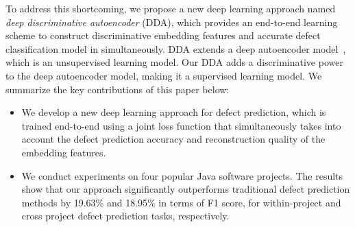 To address this shortcoming, we propose a new deep learning approach named \emph{deep discriminative autoencoder} (DDA), which provides an end-to-end learning scheme to construct discriminative embedding features and accurate defect classification model in simultaneously. DDA extends a deep autoencoder model~\cite{Vincent2010}, which is an unsupervised learning model. Our DDA adds a discriminative power to the deep autoencoder model, making it a supervised learning model.
We summarize the key contributions of this paper below:
\begin{itemize}
	\item We develop a new deep learning approach for defect prediction, which is trained end-to-end using a joint loss function that simultaneously takes into account the defect prediction accuracy and reconstruction quality of the embedding features.
	\item We conduct experiments on four popular Java software projects. The results show that our approach significantly outperforms traditional defect prediction methods by 19.63\% and 18.95\% in terms of F1 score, for within-project and cross project defect prediction tasks, respectively. 
\end{itemize}

